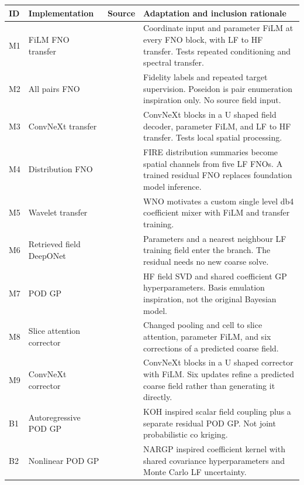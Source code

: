 \begin{tabular}{p{.035\linewidth}p{.22\linewidth}p{.25\linewidth}p{.39\linewidth}}
\toprule
ID & Implementation & Source & Adaptation and inclusion rationale \\
\midrule
M1 & FiLM FNO transfer & \citep{li2021fno,perez2018,lyu2023} & Coordinate input and parameter FiLM at every FNO block, with LF to HF transfer. Tests repeated conditioning and spectral transfer. \\
M2 & All pairs FNO & \citep{li2021fno,perez2018,herde2024} & Fidelity labels and repeated target supervision. Poseidon is pair enumeration inspiration only. No source field input. \\
M3 & ConvNeXt transfer & \citep{liu2022convnext,ronneberger2015,perez2018,lyu2023} & ConvNeXt blocks in a U shaped field decoder, parameter FiLM, and LF to HF transfer. Tests local spatial processing. \\
M4 & Distribution FNO & \citep{yu2026fire,li2021fno} & FIRE distribution summaries become spatial channels from five LF FNOs. A trained residual FNO replaces foundation model inference. \\
M5 & Wavelet transfer & \citep{tripura2022wno,perez2018,lyu2023} & WNO motivates a custom single level db4 coefficient mixer with FiLM and transfer training. \\
M6 & Retrieved field DeepONet & \citep{lu2021,lu2022mf} & Parameters and a nearest neighbour LF training field enter the branch. The residual needs no new coarse solve. \\
M7 & POD GP & \citep{higdon2008} & HF field SVD and shared coefficient GP hyperparameters. Basis emulation inspiration, not the original Bayesian model. \\
M8 & Slice attention corrector & \citep{wu2024transolver,perez2018} & Changed pooling and cell to slice attention, parameter FiLM, and six corrections of a predicted coarse field. \\
M9 & ConvNeXt corrector & \citep{liu2022convnext,ronneberger2015,perez2018} & ConvNeXt blocks in a U shaped corrector with FiLM. Six updates refine a predicted coarse field rather than generating it directly. \\
B1 & Autoregressive POD GP & \citep{kennedy2000} & KOH inspired scalar field coupling plus a separate residual POD GP. Not joint probabilistic co kriging. \\
B2 & Nonlinear POD GP & \citep{perdikaris2017} & NARGP inspired coefficient kernel with shared covariance hyperparameters and Monte Carlo LF uncertainty. \\

\end{tabular}
